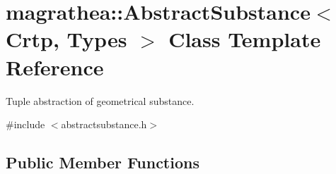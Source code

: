 \hypertarget{classmagrathea_1_1AbstractSubstance}{\section{magrathea\-:\-:Abstract\-Substance$<$ Crtp, Types $>$ Class Template Reference}
\label{classmagrathea_1_1AbstractSubstance}
}


Tuple abstraction of geometrical substance.  




{\ttfamily \#include $<$abstractsubstance.\-h$>$}

\subsection*{Public Member Functions}
